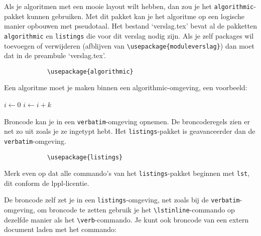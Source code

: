 	
	
	Als je algoritmen met een mooie layout wilt hebben, dan zou je het
	\verb!algorithmic!-pakket kunnen gebruiken. Met dit pakket kan je het
	algoritme op een logische manier opbouwen met pseudotaal. Het bestand
	`verslag.tex' bevat al de pakketten \verb!algorithmic! en
	\verb!listings! die voor dit verslag nodig zijn. Als je zelf packages
	wil toevoegen of verwijderen (afblijven van
	\verb!\usepackage{moduleverslag}!)  dan moet dat in de preambule
	`verslag.tex'.
	
	\begin{Aanpassen}
		\begin{verbatim}
			\usepackage{algorithmic}
		\end{verbatim}
	\end{Aanpassen}
	
	Een algoritme moet je maken binnen een algorithmic-omgeving, een
	voorbeeld:
	
	\begin{Aanpassen}[\small]
		\begin{algorithmic}
			\STATE $i\gets 0$
			\ELSE
			\STATE $i\gets i+k$
			\ENDIF
			\ENDIF 
		\end{algorithmic}
	\end{Aanpassen}
	
	
	Broncode kan je in een \verb!verbatim!-omgeving opnemen. De
	broncoderegels zien er net zo uit zoals je ze ingetypt hebt.  Het
	\verb!listings!-pakket is geavanceerder dan de
	\verb!verbatim!-omgeving.
	
	\begin{Aanpassen}
		\begin{verbatim}
			\usepackage{listings}
		\end{verbatim}
	\end{Aanpassen}
	
	Merk even op dat alle commando's van het \verb!listings!-pakket
	beginnen met \verb!lst!, dit conform de lppl-licentie.
	
	De broncode zelf zet je in een \verb!listings!-omgeving, net zoals bij
	de \verb!verbatim!-omgeving, om broncode te zetten gebruik je het
	\verb!\lstinline!-commando op dezelfde manier als het
	\verb!\verb!-commando. Je kunt ook broncode van een extern document laden met het commando:
	
	\begin{Aanpassen}
		\begin{verbatim}
			
		\end{verbatim}
	\end{Aanpassen}
	
